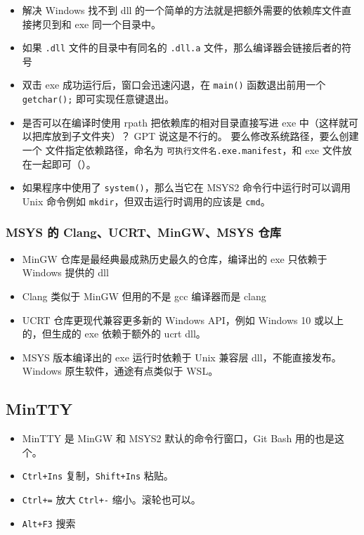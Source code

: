 \begin{itemize}
\item 解决 Windows 找不到 dll 的一个简单的方法就是把额外需要的依赖库文件直接拷贝到和 exe 同一个目录中。
\item 如果 \verb`.dll` 文件的目录中有同名的 \verb`.dll.a` 文件，那么编译器会链接后者的符号
\item 双击 exe 成功运行后，窗口会迅速闪退，在 \verb`main()` 函数退出前用一个 \verb`getchar();` 即可实现任意键退出。
\item 是否可以在编译时使用 rpath 把依赖库的相对目录直接写进 exe 中（这样就可以把库放到子文件夹）？ GPT 说这是不行的。 要么修改系统路径，要么创建一个  文件指定依赖路径，命名为 \verb`可执行文件名.exe.manifest`，和 exe 文件放在一起即可（）。
\item 如果程序中使用了 \verb`system()`，那么当它在 MSYS2 命令行中运行时可以调用 Unix 命令例如 \verb`mkdir`，但双击运行时调用的应该是 \verb`cmd`。
\end{itemize}

\subsubsection{MSYS 的 Clang、UCRT、MinGW、MSYS 仓库}
\begin{itemize}
\item MinGW 仓库是最经典最成熟历史最久的仓库，编译出的 exe 只依赖于 Windows 提供的 dll
\item Clang 类似于 MinGW 但用的不是 gcc 编译器而是 clang
\item UCRT 仓库更现代兼容更多新的 Windows API，例如 Windows 10 或以上的，但生成的 exe 依赖于额外的 ucrt dll。
\item MSYS 版本编译出的 exe 运行时依赖于 Unix 兼容层 dll，不能直接发布。 Windows 原生软件，通途有点类似于 WSL。
\end{itemize}

\subsection{MinTTY}
\begin{itemize}
\item MinTTY 是 MinGW 和 MSYS2 默认的命令行窗口，Git Bash 用的也是这个。
\item \verb`Ctrl+Ins` 复制，\verb`Shift+Ins` 粘贴。
\item \verb`Ctrl+=` 放大 \verb`Ctrl+-` 缩小。滚轮也可以。
\item \verb`Alt+F3` 搜索
\end{itemize}
